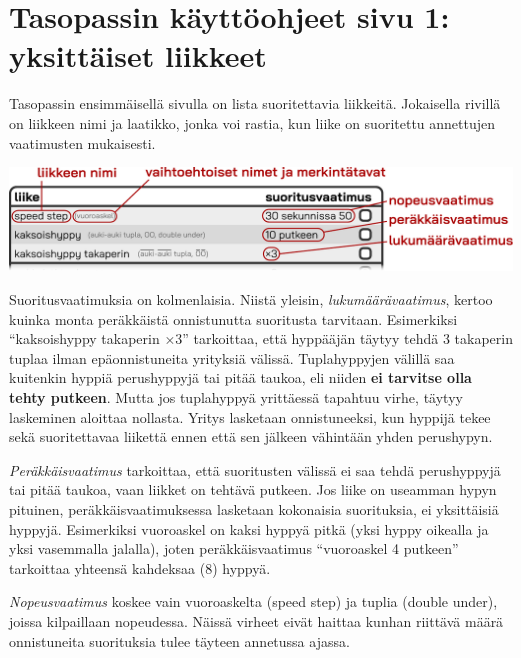 \documentclass{article}
\begin{document}
\section*{Tasopassin käyttöohjeet sivu 1: yksittäiset liikkeet}
Tasopassin ensimmäisellä sivulla on lista suoritettavia liikkeitä. Jokaisella
rivillä on liikkeen nimi ja laatikko, jonka voi rastia, kun liike on suoritettu
annettujen vaatimusten mukaisesti.
\vspace*{-.5em}
\begin{center}
	\includegraphics[scale=.75]{skill_table_example.pdf}
\end{center}
\vspace*{-.5em}
Suoritusvaatimuksia on kolmenlaisia. Niistä yleisin, \emph{lukumäärävaatimus},
kertoo kuinka monta peräkkäistä onnistunutta suoritusta tarvitaan. Esimerkiksi
``kaksoishyppy takaperin ×3'' tarkoittaa, että hyppääjän täytyy tehdä 3
takaperin tuplaa ilman epäonnistuneita yrityksiä välissä. Tuplahyppyjen välillä
saa kuitenkin hyppiä perushyppyjä tai pitää taukoa, eli niiden \textbf{ei
tarvitse olla tehty putkeen}. Mutta jos tuplahyppyä yrittäessä tapahtuu virhe,
täytyy laskeminen aloittaa nollasta. Yritys lasketaan onnistuneeksi, kun hyppijä
tekee sekä suoritettavaa liikettä ennen että sen jälkeen vähintään yhden
perushypyn.

\emph{Peräkkäisvaatimus} tarkoittaa, että suoritusten välissä ei saa tehdä
perushyppyjä tai pitää taukoa, vaan liikket on tehtävä putkeen. Jos liike on
useamman hypyn pituinen, peräkkäisvaatimuksessa lasketaan kokonaisia
suorituksia, ei yksittäisiä hyppyjä. Esimerkiksi vuoroaskel on kaksi hyppyä
pitkä (yksi hyppy oikealla ja yksi vasemmalla jalalla), joten peräkkäisvaatimus
``vuoroaskel 4 putkeen'' tarkoittaa yhteensä kahdeksaa (8) hyppyä.

\emph{Nopeusvaatimus} koskee vain vuoroaskelta (speed step) ja tuplia (double
under), joissa kilpaillaan nopeudessa. Näissä virheet eivät haittaa kunhan
riittävä määrä onnistuneita suorituksia tulee täyteen annetussa ajassa.
\end{document}
